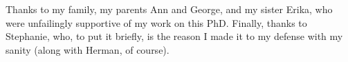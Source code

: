 \begin{frontmatter}
\begin{acknowledgment}
Thanks to my family, my parents Ann and George, and my sister Erika, who were unfailingly supportive of my work on this PhD. Finally, thanks to Stephanie, who, to put it briefly, is the reason I made it to my defense with my sanity (along with Herman, of course).

\end{acknowledgment}

% 
%

\tableofcontents

\listoftables

\listoffigures

\end{frontmatter}
